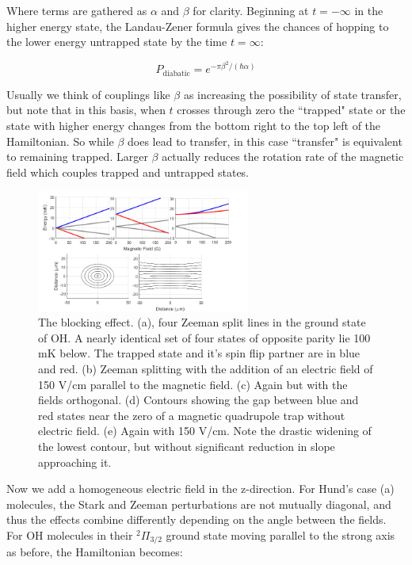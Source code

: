 \documentclass[%
 reprint,
 amsmath,amssymb,
 aps,
prl,
]{revtex4-1}
\begin{document}
\noindent Where terms are gathered as $\alpha$ and $\beta$ for clarity. Beginning at $t=-\infty$ in the higher energy state, the Landau-Zener formula gives the chances of hopping to the lower energy untrapped state by the time $t=\infty$:

\begin{equation}
P_{\text{diabatic}}=e^{-\pi\beta^2 /(\hbar\alpha)}
\end{equation}

\noindent Usually we think of couplings like $\beta$ as increasing the possibility of state transfer, but note that in this basis, when $t$ crosses through zero the ``trapped" state or the state with higher energy changes from the bottom right to the top left of the Hamiltonian. So while $\beta$ does lead to transfer, in this case ``transfer" is equivalent to remaining trapped. Larger $\beta$ actually reduces the rotation rate of the magnetic field which couples trapped and untrapped states.

\begin{figure}[b]
\includegraphics[width=70mm]{blocking.png}%
\caption{
The blocking effect. (a), four Zeeman split lines in the ground state of OH. A nearly identical set of four states of opposite parity lie 100 mK below. The trapped state and it's spin flip partner are in blue and red. (b) Zeeman splitting with the addition of an electric field of 150 V/cm parallel to the magnetic field. (c) Again but with the fields orthogonal. (d) Contours showing the gap between blue and red states near the zero of a magnetic quadrupole trap without electric field. (e) Again with 150 V/cm. Note the drastic widening of the lowest contour, but without significant reduction in slope approaching it.
\label{fig:blocking}}
\end{figure}

Now we add a homogeneous electric field in the z-direction. For Hund's case (a) molecules, the Stark and Zeeman perturbations are not mutually diagonal\cite{Lara2008}, and thus the effects combine differently depending on the angle between the fields. For OH molecules in their $^2\Pi_{3/2}$ ground state moving parallel to the strong axis as before, the Hamiltonian becomes: 
\end{document}
